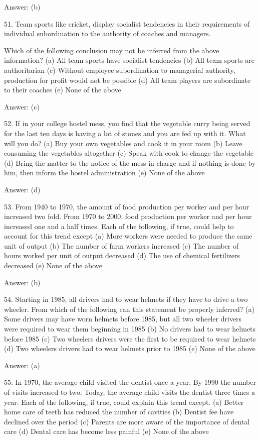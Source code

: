 Answer: (b)


51. Team sports like cricket, display socialist tendencies in their requirements of individual subordination to the authority of coaches and managers.

Which of the following conclusion may not be inferred from the above information?
(a) All team sports have socialist tendencies
(b) All team sports are authoritarian
(c) Without employee subordination to managerial authority, production for profit would not be possible
(d) All team players are subordinate to their coaches
(e) None of the above

Answer: (c)

52. If in your college hostel mess, you find that the vegetable curry being served for the last ten days is having a lot of stones and you are fed up with it. What will you do?
(a) Buy your own vegetables and cook it in your room
(b) Leave consuming the vegetables altogether
(c) Speak with cook to change the vegetable
(d) Bring the matter to the notice of the mess in charge and if nothing is done by him, then inform the hostel administration
(e) None of the above

Answer: (d)

53. From 1940 to 1970, the amount of food production per worker and per hour increased two fold. From 1970 to 2000, food production per worker and per hour increased one and a half times.
Each of the following, if true, could help to account for this trend except (a) More workers were needed to produce the same unit of output
(b) The number of farm workers increased
(c) The number of hours worked per unit of output decreased
(d) The use of chemical fertilizers decreased
(e) None of the above

Answer: (b)

54. Starting in 1985, all drivers had to wear helmets if they have to drive a two wheeler. From which of the following can this statement be properly inferred?
(a) Some drivers may have worn helmets before 1985, but all two wheeler drivers were required to wear them beginning in 1985
(b) No drivers had to wear helmets before 1985
(c) Two wheelers drivers were the first to be required to wear helmets
(d) Two wheelers drivers had to wear helmets prior to 1985
(e) None of the above

Answer: (a)

55. In 1970, the average child visited the dentist once a year. By 1990 the number of visits increased to two. Today, the average child visits the dentist three times a year. Each of the following, if true, could explain this trend except.
(a) Better home care of teeth has reduced the number of cavities
(b) Dentist fee have declined over the period
(c) Parents are more aware of the importance of dental care
(d) Dental care has become less painful
(e) None of the above

